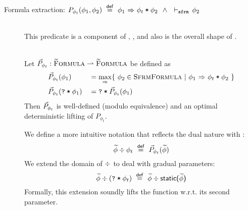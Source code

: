 \begin{description}
    \item[Formula extraction: $P_{\phi_t}(\phi_1, \phi_2) ~\overset{\textup{\textmd{\textsf{def}}}}{=}~ {\phi_1} \,\,{\Rightarrow}\,\, {\textup{\texttt{$\phi_t$\:*\:$\phi_2$}}} ~~\wedge~~ \vdash_\texttt{sfrm}\, \phi_2$]~\\
    This predicate is a component of , ,  and also is the overall shape of .
    \begin{lemma}~\\
        Let $\vec{P}_{\phi_t} : \textup{\textsc{\ensuremath{\widetilde{\text{F}}}ormula}} \rightharpoonup \textup{\textsc{\ensuremath{\widetilde{\text{F}}}ormula}}$ be defined as
        \begin{alignat*}{2}
        & \vec{P}_{\phi_t}(\phi_1)          & &= \underset{{} \,\,{\Rightarrow}\,\, {}}{\max} \{~ \phi_2 \in \textup{\textsc{SfrmFormula}} ~|~ {\phi_1} \,\,{\Rightarrow}\,\, {\textup{\texttt{$\phi_t$\:*\:$\phi_2$}}} ~\} \\
        & \vec{P}_{\phi_t}(\textup{\texttt{\textup{\texttt{?}}\:*\:\ensuremath{\phi_1}}}) & &= \textup{\texttt{\textup{\texttt{?}}\:*\:\ensuremath{\vec{P}_{\phi_t}(\phi_1)}}}
        \end{alignat*}
        Then $\vec{P}_{\phi_t}$ is well-defined (modulo equivalence) and an optimal deterministic lifting of $P_{\phi_t}$.
    \end{lemma}
    We define a more intuitive notation that reflects the dual nature with \ttt{*}:
    \begin{displaymath}
    \widetilde{\phi}\div\phi_t ~\overset{\textup{\textmd{\textsf{def}}}}{=}~ \vec{P}_{\phi_t}(\widetilde{\phi})
    \end{displaymath}
    We extend the domain of $\div$ to deal with gradual parameters:
    \begin{displaymath}
    \widetilde{\phi}\div(\textup{\texttt{\textup{\texttt{?}}\:*\:\ensuremath{\phi_t}}}) ~\overset{\textup{\textmd{\textsf{def}}}}{=}~ \widetilde{\phi}\div\textup{\textmd{\textsf{static($\widetilde{\phi}$)}}}
    \end{displaymath}
    Formally, this extension soundly lifts the function w.r.t. its second parameter.
        

\end{description}

